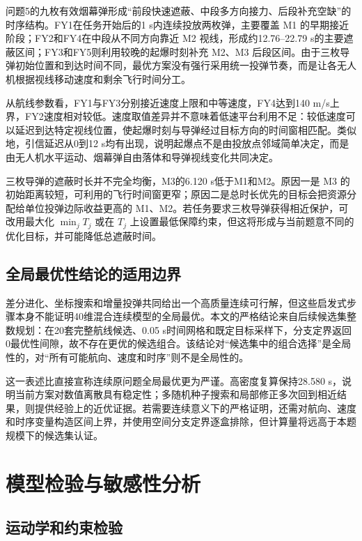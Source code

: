 \documentclass[12pt,a4paper]{ctexart}
\begin{document}
问题5的九枚有效烟幕弹形成“前段快速遮蔽、中段多方向接力、后段补充空缺”的时序结构。FY1在任务开始后的1 s内连续投放两枚弹，主要覆盖 M1 的早期接近阶段；FY2和FY4在中段从不同方向靠近 M2 视线，形成约12.76--22.79 s的主要遮蔽区间；FY3和FY5则利用较晚的起爆时刻补充 M2、M3 后段区间。由于三枚导弹初始位置和到达时间不同，最优方案没有强行采用统一投弹节奏，而是让各无人机根据视线移动速度和剩余飞行时间分工。

从航线参数看，FY1与FY3分别接近速度上限和中等速度，FY4达到140 m/s上界，FY2速度相对较低。速度取值差异并不意味着低速平台利用不足：较低速度可以延迟到达特定视线位置，使起爆时刻与导弹经过目标方向的时间窗相匹配。类似地，引信延迟从0到12 s均有出现，说明起爆点不是由投放点邻域简单决定，而是由无人机水平运动、烟幕弹自由落体和导弹视线变化共同决定。

三枚导弹的遮蔽时长并不完全均衡，M3的6.120 s低于M1和M2。原因一是 M3 的初始距离较短，可利用的飞行时间窗更窄；原因二是总时长优先的目标会把资源分配给单位投弹边际收益更高的 M1、M2。若任务要求三枚导弹获得相近保护，可改用最大化 $\min_jT_j$ 或在 $T_j$ 上设置最低保障约束，但这将形成与当前题意不同的优化目标，并可能降低总遮蔽时间。

\subsection{全局最优性结论的适用边界}

差分进化、坐标搜索和增量投弹共同给出一个高质量连续可行解，但这些启发式步骤本身不能证明40维混合连续模型的全局最优。本文的严格结论来自后续候选集整数规划：在20套完整航线候选、0.05 s时间网格和既定目标采样下，分支定界返回0最优性间隙，故不存在更优的候选组合。该结论对“候选集中的组合选择”是全局性的，对“所有可能航向、速度和时序”则不是全局性的。

这一表述比直接宣称连续原问题全局最优更为严谨。高密度复算保持28.580 s，说明当前方案对数值离散具有稳定性；多随机种子搜索和局部修正多次回到相近结果，则提供经验上的近优证据。若需要连续意义下的严格证明，还需对航向、速度和时序变量构造区间上界，并使用空间分支定界逐盒排除，但计算量将远高于本题规模下的候选集认证。

\section{模型检验与敏感性分析}

\subsection{运动学和约束检验}
\end{document}
